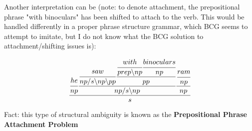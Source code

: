 \documentclass[letterpaper,12pt]{article}
\begin{document}
Another interpretation can be (note: to denote attachment, the prepositional phrase "with binoculars" has been shifted to attach to the verb. This would be handled differently in a proper phrase structure grammar, which BCG seems to attempt to imitate, but I do not know what the BCG solution to attachment/shifting issues is):

\begin{equation}
\cfrac
{	\cfrac {he} {np} 
 	\cfrac 
    {	\cfrac {saw} {np/s \backslash np \backslash pp}
    	\cfrac 
	    {	\cfrac {with} {prep \backslash np}
	    	\cfrac {binoculars} {np}
	    } 
		{pp}
	}
	{np/s \backslash np} 
    \cfrac
	{	\cfrac {ram} {np}
	}
	{np}
} 
{s}
\end{equation}

Fact: this type of structural ambiguity is known as the \textbf{Prepositional Phrase Attachment Problem}
\end{document}
